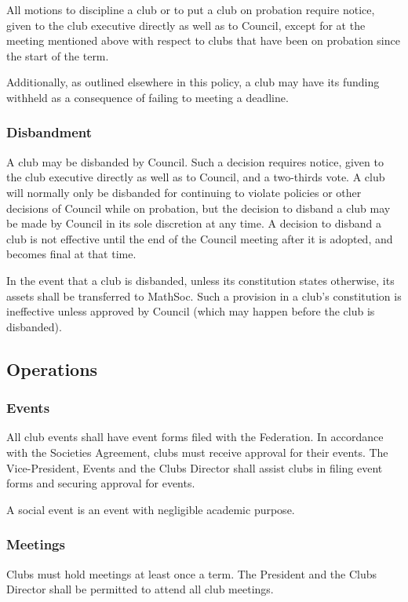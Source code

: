 All motions to discipline a club or to put a club on probation require notice,
given to the club executive directly as well as to Council, except for at the
meeting mentioned above with respect to clubs that have been on probation since
the start of the term.

Additionally, as outlined elsewhere in this policy, a club may have its funding
withheld as a consequence of failing to meeting a deadline.

\subsubsection{Disbandment}
A club may be disbanded by Council. Such a decision requires notice, given to
the club executive directly as well as to Council, and a two-thirds vote. A club
will normally only be disbanded for continuing to violate policies or other
decisions of Council while on probation, but the decision to disband a club may
be made by Council in its sole discretion at any time. A decision to disband a
club is not effective until the end of the Council meeting after it is adopted,
and becomes final at that time.

In the event that a club is disbanded, unless its constitution states otherwise,
its assets shall be transferred to MathSoc. Such a provision in a club's
constitution is ineffective unless approved by Council (which may happen before
the club is disbanded).

\subsection{Operations}
\subsubsection{Events}
All club events shall have event forms filed with the Federation. In accordance
with the Societies Agreement, clubs must receive approval for their events.  The
Vice-President, Events and the Clubs Director shall assist clubs in filing
event forms and securing approval for events.

A social event is an event with negligible academic purpose.

\subsubsection{Meetings}
Clubs must hold meetings at least once a term. The President and the Clubs
Director shall be permitted to attend all club meetings.

